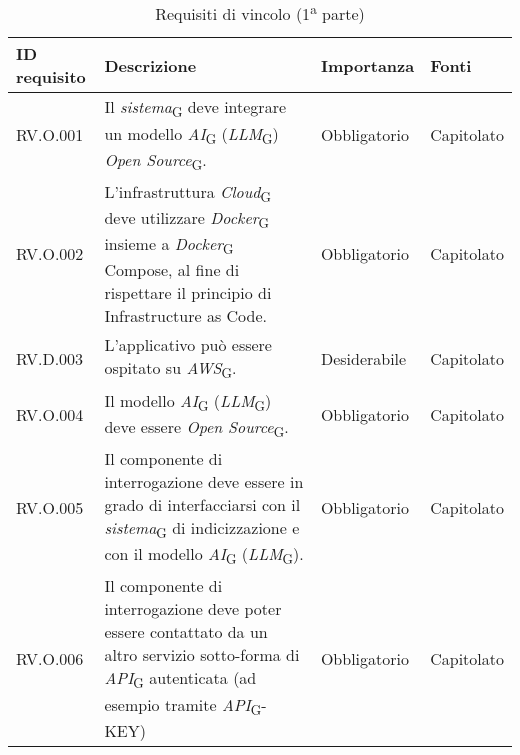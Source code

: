 \begin{table}[H]
\centering
    \begin{tabular}{|C{2.7cm}|L{7.2cm}|C{2.7cm}|C{2cm}|}
        \hline
    \textbf{ID requisito} & \textbf{Descrizione} & \textbf{Importanza} & \textbf{Fonti}  \\
    \hline
           RV.O.001 & Il \textit{sistema}\textsubscript{G} deve integrare un modello \textit{AI}\textsubscript{G} (\textit{LLM}\textsubscript{G}) \textit{Open Source}\textsubscript{G}. & Obbligatorio & Capitolato \\
          \hline 
          RV.O.002 & L’infrastruttura \textit{Cloud}\textsubscript{G} deve utilizzare \textit{Docker}\textsubscript{G} insieme a \textit{Docker}\textsubscript{G} Compose, al fine di rispettare il principio di Infrastructure as Code. & Obbligatorio & Capitolato \\
           \hline
          RV.D.003 & L'applicativo può essere ospitato su \textit{AWS}\textsubscript{G}. & Desiderabile & Capitolato \\
          \hline
          RV.O.004 & Il modello \textit{AI}\textsubscript{G} (\textit{LLM}\textsubscript{G}) deve essere \textit{Open Source}\textsubscript{G}.
         & Obbligatorio & Capitolato \\
        \hline
        RV.O.005 & Il componente di interrogazione deve essere in grado di interfacciarsi con il \textit{sistema}\textsubscript{G} di indicizzazione e con il modello \textit{AI}\textsubscript{G} (\textit{LLM}\textsubscript{G}).
         & Obbligatorio & Capitolato \\
        \hline
        RV.O.006 & Il componente di interrogazione deve poter essere contattato da un altro servizio sotto-forma di \textit{API}\textsubscript{G} autenticata (ad esempio tramite \textit{API}\textsubscript{G}-KEY)
         & Obbligatorio & Capitolato \\
         \hline
    \end{tabular}
    \caption{Requisiti di vincolo (1\textsuperscript{a}  parte)}
\end{table}
